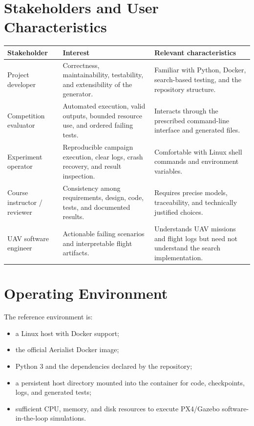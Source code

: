 \documentclass[11pt,a4paper]{report}
\begin{document}
\section{Stakeholders and User Characteristics}
\begin{table}[H]
\centering
\begin{tabularx}{\textwidth}{L{3.2cm} Y Y}
\toprule
\textbf{Stakeholder} & \textbf{Interest} & \textbf{Relevant characteristics}\\
\midrule
Project developer & Correctness, maintainability, testability, and extensibility of the generator. & Familiar with Python, Docker, search-based testing, and the repository structure.\\
Competition evaluator & Automated execution, valid outputs, bounded resource use, and ordered failing tests. & Interacts through the prescribed command-line interface and generated files.\\
Experiment operator & Reproducible campaign execution, clear logs, crash recovery, and result inspection. & Comfortable with Linux shell commands and environment variables.\\
Course instructor / reviewer & Consistency among requirements, design, code, tests, and documented results. & Requires precise models, traceability, and technically justified choices.\\
UAV software engineer & Actionable failing scenarios and interpretable flight artifacts. & Understands UAV missions and flight logs but need not understand the search implementation.\\
\bottomrule
\end{tabularx}
\end{table}

\section{Operating Environment}
The reference environment is:
\begin{itemize}
  \item a Linux host with Docker support;
  \item the official Aerialist Docker image;
  \item Python 3 and the dependencies declared by the repository;
  \item a persistent host directory mounted into the container for code, checkpoints, logs, and generated tests;
  \item sufficient CPU, memory, and disk resources to execute PX4/Gazebo software-in-the-loop simulations.
\end{itemize}
\end{document}

